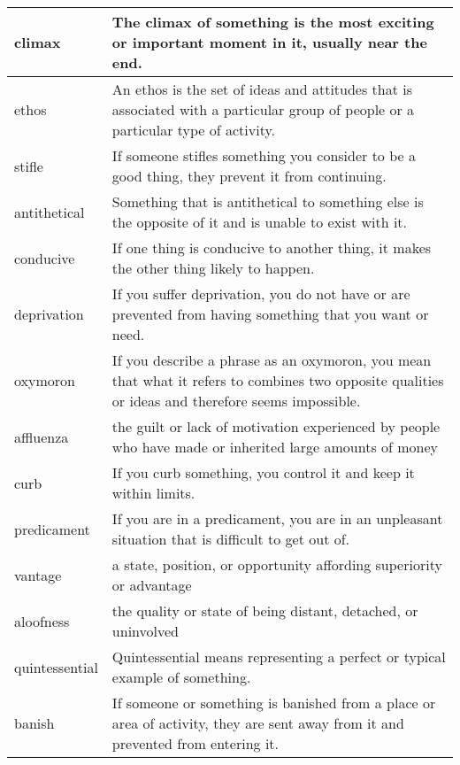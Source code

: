 \documentclass{article}
\begin{document}
\begin{center}
\begin{longtable}{|l|p{9cm}|}
\hline
climax
&
The climax of something is the most exciting or important moment in it, usually near the end.
\\

\hline
ethos
&
An ethos is the set of ideas and attitudes that is associated with a particular group of people or a particular type of activity.
\\

\hline
stifle
&
If someone stifles something you consider to be a good thing, they prevent it from continuing.
\\

\hline
antithetical
&
Something that is antithetical to something else is the opposite of it and is unable to exist with it.
\\

\hline
conducive
&
If one thing is conducive to another thing, it makes the other thing likely to happen.
\\

\hline
deprivation
&
If you suffer deprivation, you do not have or are prevented from having something that you want or need.
\\

\hline
oxymoron
&
If you describe a phrase as an oxymoron, you mean that what it refers to combines two opposite qualities or ideas and therefore seems impossible.
\\

\hline
affluenza
&
the guilt or lack of motivation experienced by people who have made or inherited large amounts of money
\\

\hline
curb
&
If you curb something, you control it and keep it within limits.
\\

\hline
predicament
&
If you are in a predicament, you are in an unpleasant situation that is difficult to get out of.
\\

\hline
vantage
&
a state, position, or opportunity affording superiority or advantage
\\

\hline
aloofness
&
the quality or state of being distant, detached, or uninvolved
\\

\hline
quintessential
&
Quintessential means representing a perfect or typical example of something.
\\

\hline
banish
&
If someone or something is banished from a place or area of activity, they are sent away from it and prevented from entering it.
\\


\end{longtable}
\end{center}
\end{document}
